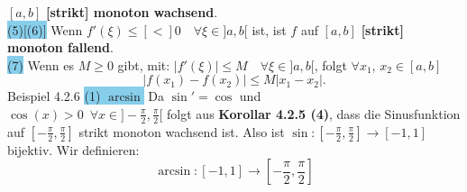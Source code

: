 \documentclass[landscape, 10pt]{article}
\begin{document}
\begin{multicols}{3}
                            \textcolor{NavyBlue}{$[a,b]$} 
                            \textbf{[strikt] monoton wachsend}.\\
                     \colorbox{SkyBlue}{(5)[(6)]}
                            Wenn \textcolor{NavyBlue}{
                            $f'(\xi)\leqslant[<]0\quad
                            \forall\xi\in]a,b[$} ist, 
                            ist \textcolor{NavyBlue}{$f$} auf 
                            \textcolor{NavyBlue}{$[a,b]$} 
                            \textbf{[strikt] monoton fallend}.\\
                     \colorbox{SkyBlue}{(7)} Wenn es 
                            \textcolor{NavyBlue}{$M\geqslant0$} gibt, mit: 
                            \textcolor{NavyBlue}{
                            $|f'(\xi)|\leqslant M\quad
                            \forall\xi\in]a,b[$}, folgt 
                            \textcolor{NavyBlue}{$\forall x_1$},
                            \textcolor{NavyBlue}{$x_2\in[a,b]$}
                            \begin{equation*}
                                   |f(x_1)-f(x_2)|
                                   \leqslant M|x_1-x_2|.
                            \end{equation*}
              \colorbox{Dandelion}{Beispiel 4.2.6}
                     \colorbox{SkyBlue}{(1) $\arcsin$} 
                            Da \textcolor{NavyBlue}{
                            $\sin'=\cos$} und \\
                            \textcolor{NavyBlue}{
                            $\cos(x)>0\enspace
                            \forall x\in]-\frac{\pi}{2},
                            \frac{\pi}{2}[$}
                            folgt aus 
                            \textbf{Korollar 4.2.5 (4)}, dass die 
                            Sinusfunktion auf
                            \textcolor{NavyBlue}{
                            $[-\frac{\pi}{2},\frac{\pi}{2}]$} 
                            strikt monoton wachsend
                            ist. Also ist 
                            \textcolor{NavyBlue}{
                            $\sin:[-\frac{\pi}{2},
                            \frac{\pi}{2}]\longrightarrow[-1,1]$}
                            bijektiv. Wir definieren:
                            \begin{equation*}
                                   \arcsin:[-1,1]\longrightarrow
                                   [-\frac{\pi}{2},\frac{\pi}{2}]
                            \end{equation*}

\end{multicols}
\end{document}
